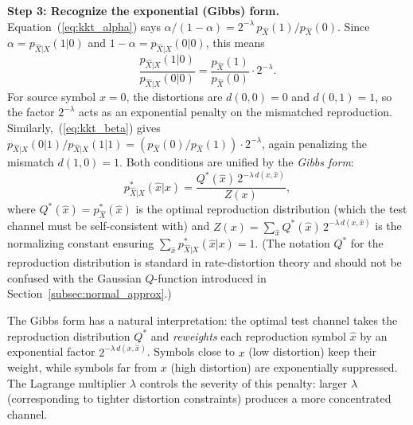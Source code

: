 \documentclass[11pt]{article}
\begin{document}
\smallskip
\noindent\textbf{Step 3: Recognize the exponential (Gibbs) form.}
Equation~(\ref{eq:kkt_alpha}) says
$\alpha/(1-\alpha) = 2^{-\lambda}\,p_{\hat{X}}(1)/p_{\hat{X}}(0)$.
Since $\alpha = p_{\hat{X}|X}(1|0)$ and $1-\alpha = p_{\hat{X}|X}(0|0)$,
this means
\[
\frac{p_{\hat{X}|X}(1|0)}{p_{\hat{X}|X}(0|0)}
= \frac{p_{\hat{X}}(1)}{p_{\hat{X}}(0)}\cdot 2^{-\lambda}.
\]
For source symbol $x = 0$, the distortions are $d(0,0) = 0$ and $d(0,1) = 1$,
so the factor $2^{-\lambda}$ acts as an exponential penalty on the mismatched
reproduction.
Similarly,~(\ref{eq:kkt_beta}) gives
$p_{\hat{X}|X}(0|1)/p_{\hat{X}|X}(1|1) = (p_{\hat{X}}(0)/p_{\hat{X}}(1))
\cdot 2^{-\lambda}$,
again penalizing the mismatch $d(1,0) = 1$.
Both conditions are unified by the \emph{Gibbs form}:
\begin{equation}
\label{eq:gibbs_form}
p^*_{\hat{X}|X}(\hat{x}|x)
= \frac{Q^*(\hat{x})\, 2^{-\lambda\, d(x,\hat{x})}}{Z(x)},
\end{equation}
where $Q^*(\hat{x}) = p^*_{\hat{X}}(\hat{x})$ is the optimal reproduction
distribution (which the test channel must be self-consistent with) and
$Z(x) = \sum_{\hat{x}} Q^*(\hat{x})\,2^{-\lambda\,d(x,\hat{x})}$ is the
normalizing constant ensuring $\sum_{\hat{x}} p^*_{\hat{X}|X}(\hat{x}|x) = 1$.
(The notation $Q^*$ for the reproduction distribution is standard in
rate-distortion theory and should not be confused with the Gaussian $Q$-function
introduced in Section~\ref{subsec:normal_approx}.)

The Gibbs form has a natural interpretation: the optimal test channel takes
the reproduction distribution $Q^*$ and \emph{reweights} each reproduction symbol
$\hat{x}$ by an exponential factor $2^{-\lambda\,d(x,\hat{x})}$.
Symbols close to $x$ (low distortion) keep their weight, while symbols far
from $x$ (high distortion) are exponentially suppressed.
The Lagrange multiplier $\lambda$ controls the severity of this penalty:
larger $\lambda$ (corresponding to tighter distortion constraints) produces
a more concentrated channel.
\end{document}
